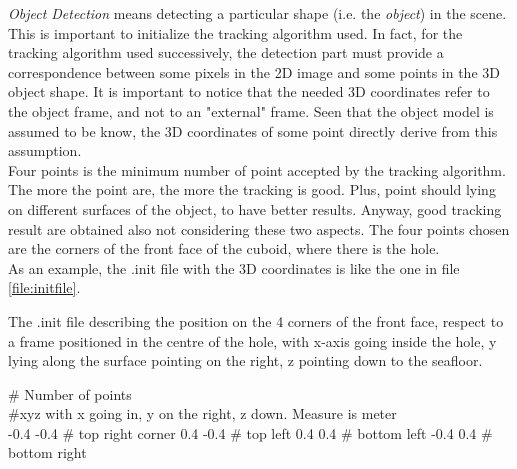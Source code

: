 \textit{Object Detection} means detecting a particular shape (i.e. the \textit{object}) in the scene. This is important to initialize the tracking algorithm used. In fact, for the tracking algorithm used successively, the detection part must provide a correspondence between some pixels in the 2D image and some points in the 3D object shape. It is important to notice that the needed 3D coordinates refer to the object frame, and not to an "external" frame. Seen that the object model is assumed to be know, the 3D coordinates of some point directly derive from this assumption.\\
Four points is the minimum number of point accepted by the tracking algorithm. The more the point are, the more the tracking is good. Plus, point should lying on different surfaces of the object, to have better results. Anyway, good tracking result are obtained also not considering these two aspects. The four points chosen are the corners of the front face of the cuboid, where there is the hole.\\
As an example, the .init file with the 3D coordinates is like the one in file \ref{file:initfile}.
\begin{fileAlgorithm}
	\caption{The .init file describing  the position on the 4 corners of the front face, respect to a frame positioned in the centre of the hole, with x-axis going inside the hole, y lying along the surface pointing on the right, z pointing down to the seafloor.}
	\label{file:initfile}
	\begin{algorithmic}[1]
	         \hspace*{50px}    \# Number of points\\
	          \hspace*{59px}        \#xyz with x going in, y on the right, z down. Measure is meter\\
	      -0.4     -0.4  \hspace*{5px} \# top right corner
	      0.4      -0.4  \hspace*{8px}   \# top left
	      0.4     0.4   \hspace*{11px} \# bottom left
	      -0.4    0.4    \hspace*{7px} \# bottom right
	\end{algorithmic}
\end{fileAlgorithm}

